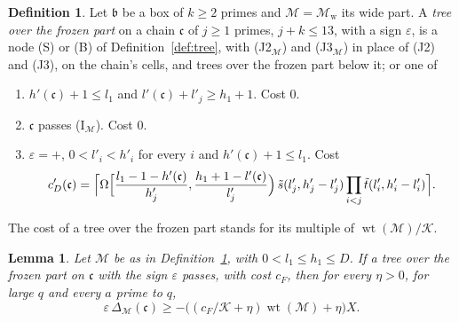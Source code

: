 \documentclass[11pt]{article}
\newtheorem{lemma}[theorem]{Lemma}
\theoremstyle{definition}
\newtheorem{definition}[theorem]{Definition}
\begin{document}
\begin{definition}\label{def:frozen-tree}
Let $\mathfrak b$ be a box of $k \ge 2$ primes and $\mathcal M = \mathcal M_{\mathrm w}$ its wide part. A \emph{tree
over the frozen part} on a chain $\mathfrak c$ of $j \ge 1$ primes, $j + k \le 13$, with a sign $\varepsilon$, is a node
(S) or (B) of Definition~\ref{def:tree}, with (J2$_{\mathcal M}$) and (J3$_{\mathcal M}$) in place of (J2) and (J3), on
the chain's cells, and trees over the frozen part below it; or one of
\begin{enumerate}
\item[(V$_{\mathcal M}$)] $h'(\mathfrak c) + 1 \le l_1$ and $l'(\mathfrak c) + l'_j \ge h_1 + 1$. Cost $0$.
\item[(E$_{\mathcal M}$)] $\mathfrak c$ passes (I$_{\mathcal M}$). Cost $0$.
\item[(D$_{\mathcal M}$)] $\varepsilon = +$, $0 < l'_i < h'_i$ for every $i$ and $h'(\mathfrak c) + 1 \le l_1$. Cost
  \[
    c'_D(\mathfrak c) = \Bigl\lceil \Omega\Bigl[\frac{l_1 - 1 - h'(\mathfrak c)}{h'_j}, \frac{h_1 + 1 - l'(\mathfrak
    c)}{l'_j}\Bigr)\, \tilde s(l'_j, h'_j - l'_j) \prod_{i < j} \tilde t(l'_i, h'_i - l'_i) \Bigr\rceil.
  \]
\end{enumerate}
The cost of a tree over the frozen part stands for its multiple of $\operatorname{wt}(\mathcal M)/\mathcal K$.
\end{definition}

\begin{lemma}\label{lem:frozen-tree}
Let $\mathcal M$ be as in Definition~\ref{def:frozen-tree}, with $0 < l_1 \le h_1 \le D$. If a tree over the frozen
part on $\mathfrak c$ with the sign $\varepsilon$ passes, with cost $c_F$, then for every $\eta > 0$, for large $q$ and
every
$a$ prime to $q$,
\[
  \varepsilon\, \Delta_{\mathcal M}(\mathfrak c) \ge -\bigl((c_F/\mathcal K + \eta) \operatorname{wt}(\mathcal M) +
  \eta\bigr) X.
\]
\end{lemma}
\end{document}
